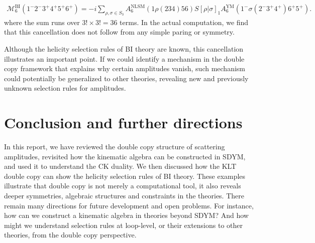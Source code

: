 \documentclass[a4paper,11pt]{article}
\begin{document}
\begin{equation}
    \begin{split}
    \mathcal{M}^{\text{BI}}_6(1^-2^-3^+4^+5^+6^+)=-i\sum_{\rho, \sigma\in S_3}A_6^{\text{NLSM}}(1\rho(234)56)S[\rho|\sigma]_1 A_6^{\text{YM}}(1^-\sigma(2^-3^+4^+)6^+5^+).
    \end{split}
\end{equation}
where the sum runs over $3!\times 3!=36$ terms. In the actual computation, we find that this cancellation does not follow from any simple paring or symmetry.\par
Although the helicity selection rules of BI theory are known, this cancellation illustrates an important point. 
If we could identify a mechanism in the double copy framework that explains why certain amplitudes vanish, such mechanism could potentially be generalized to other theories,
revealing new and previously unknown selection rules for amplitudes.




\section{Conclusion and further directions}
In this report, we have reviewed the double copy structure of scattering amplitudes, revisited how the kinematic algebra can be constructed in SDYM,
and used it to understand the CK duality. We then discussed how the KLT double copy can show the helicity selection rules of BI theory. These examples 
illustrate that double copy is not merely a computational tool, it also reveals deeper symmetries, algebraic structures and constraints in the theories.
There remain many directions for future development and open problems. For instance, how can we construct a kinematic algebra in theories beyond SDYM? 
And how might we understand selection rules at loop-level, or their extensions to other theories, from the double copy perspective.
\appendix
\end{document}
